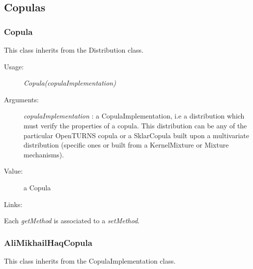 \newpage
\subsection{Copulas}

\subsubsection{Copula}


This class inherits from the Distribution class.

\begin{description}

\item[Usage:] \textit{Copula(copulaImplementation)}

\item[Arguments:]  \textit{copulaImplementation}       : a CopulaImplementation, i.e a distribution which must verify the properties of a copula. This distribution can be any of the particular OpenTURNS copula or a SklarCopula built upon a multivariate distribution (specific ones or  built from a  KernelMixture or Mixture mechanisms).

\item[Value:] a Copula

\item[Links:]  \rule{0pt}{1em}
\end{description}

Each  \textit{getMethod}  is associated to a \textit{setMethod}.

\newpage
\subsubsection{AliMikhailHaqCopula}

This class inherits from the CopulaImplementation class.

